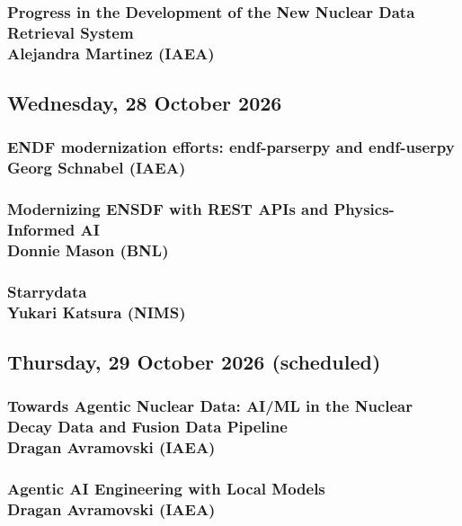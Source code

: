 \documentclass{indc-report}
\begin{document}
\subsubsection{Progress in the Development of the New Nuclear Data Retrieval System\\ Alejandra Martinez (IAEA)}


\subsection{Wednesday, 28 October 2026}

\subsubsection{ENDF modernization efforts: endf-parserpy and endf-userpy\\ Georg Schnabel (IAEA)}


\subsubsection{Modernizing ENSDF with REST APIs and Physics-Informed AI\\ Donnie Mason (BNL)}


\subsubsection{Starrydata\\ Yukari Katsura (NIMS)}


\subsection{Thursday, 29 October 2026 (scheduled)}

\subsubsection{Towards Agentic Nuclear Data: AI/ML in the Nuclear Decay Data and Fusion Data Pipeline\\ Dragan Avramovski (IAEA)}


\subsubsection{Agentic AI Engineering with Local Models\\ Dragan Avramovski (IAEA)}

\end{document}
